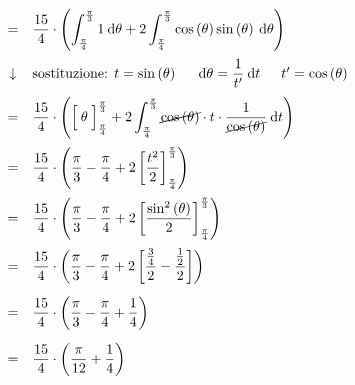 \documentclass[a4paper]{article}
\begin{document}
\begin{equation*}
\begin{array}{rcl}
			&=&
			\dfrac{15}{4} \cdot \left(\displaystyle\int_{\frac{\pi}{4}}^{\frac{\pi}{3}} 1 \:\mathrm{d}\theta + 2\int_{\frac{\pi}{4}}^{\frac{\pi}{3}} \cos\left(\theta\right)\sin\left(\theta\right) \:\mathrm{d}\theta\right) \\ [1.5em]
			&\downarrow&
			\text{sostituzione: } t = \sin\left(\theta\right) \hspace{1.5em} \mathrm{d}\theta = \dfrac{1}{t'}\:\mathrm{d}t \hspace{1.5em} t' = \cos\left(\theta\right) \\ [1em]
			&=&
			\displaystyle\dfrac{15}{4} \cdot \left(\left[\dfrac{}{} \theta \dfrac{}{}\right]_{\frac{\pi}{4}}^{\frac{\pi}{3}} + 2\int_{\frac{\pi}{4}}^{\frac{\pi}{3}} \cancel{\cos\left(\theta\right)} \cdot t \cdot \dfrac{1}{\cancel{\cos\left(\theta\right)}} \:\mathrm{d}t\right) \\ [1.5em]
			&=&
			\displaystyle\dfrac{15}{4} \cdot \left(\dfrac{\pi}{3} - \dfrac{\pi}{4} + 2 \left[\dfrac{t^{2}}{2}\right]_{\frac{\pi}{4}}^{\frac{\pi}{3}} \right) \\ [1.5em]
			&=&
			\displaystyle\dfrac{15}{4} \cdot \left(\dfrac{\pi}{3} - \dfrac{\pi}{4} + 2 \left[\dfrac{\sin^{2}\left(\theta\right)}{2}\right]_{\frac{\pi}{4}}^{\frac{\pi}{3}} \right) \\ [1.5em]
			&=&
			\displaystyle\dfrac{15}{4} \cdot \left(\dfrac{\pi}{3} - \dfrac{\pi}{4} + 2 \left[\dfrac{\frac{3}{4}}{2} - \dfrac{\frac{1}{2}}{2}\right] \right) \\ [1.5em]
			&=&
			\displaystyle\dfrac{15}{4} \cdot \left(\dfrac{\pi}{3} - \dfrac{\pi}{4} + \dfrac{1}{4}\right) \\ [1.5em]
			&=&
			\displaystyle\dfrac{15}{4} \cdot \left(\dfrac{\pi}{12} + \dfrac{1}{4}\right) \\ [1.5em]
		\end{array}
	\end{equation*}\newpage
\end{document}
